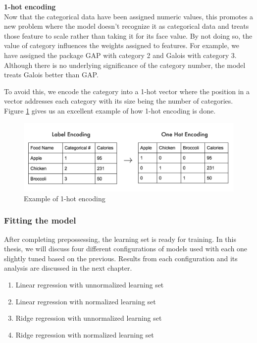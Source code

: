 \textbf{1-hot encoding}\\
Now that the categorical data have been assigned numeric values, this promotes a new problem where the model doesn't recognize it as categorical data and treats those feature to scale rather than taking it for its face value. By not doing so, the value of category influences the weights assigned to features. For example, we have assigned the package GAP with category 2 and Galois with category 3. Although there is no underlying significance of the category number, the model treats Galois better than GAP. 

To avoid this, we encode the category into a 1-hot vector where the position in a vector addresses each category with its size being the number of categories. Figure \ref{Example of 1-hot encoding} gives us an excellent example of how 1-hot encoding is done.


\begin{figure}
    \centering
    \includegraphics[width=1\columnwidth]{figures/preprocess_1_hot.jpeg}
    \caption{Example of 1-hot encoding}
    \label{Example of 1-hot encoding}
\end{figure}

\subsubsection{Fitting the model}
After completing prepossessing, the learning set is ready for training. In this thesis, we will discuss four different configurations of models used with each one slightly tuned based on the previous. Results from each configuration and its analysis are discussed in the next chapter. \\

\begin{enumerate}
    \item Linear regression with unnormalized learning set
    \item Linear regression with normalized learning set
    \item Ridge regression with unnormalized learning set
    \item Ridge regression with normalized learning set
\end{enumerate}
 

